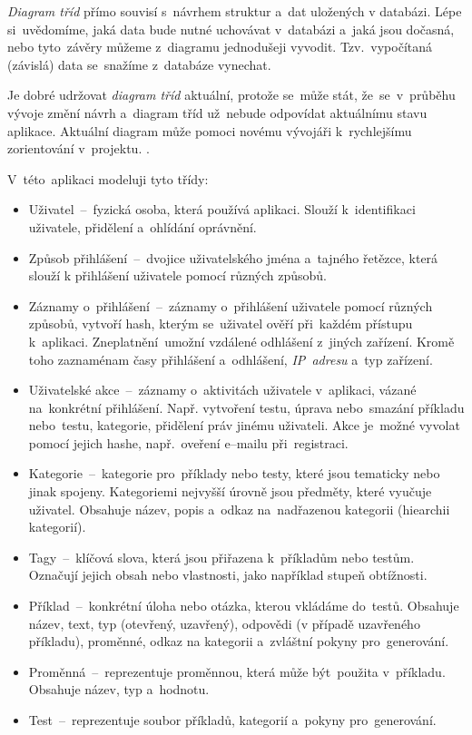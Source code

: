 \documentclass[11pt,a4paper]{report}
\begin{document}
                \emph{Diagram tříd} přímo souvisí s~návrhem struktur a~dat uložených v databázi. Lépe si~uvědomíme, jaká data bude nutné uchovávat v~databázi a~jaká jsou dočasná, nebo tyto~závěry můžeme z~diagramu jednodušeji vyvodit. Tzv.~vypočítaná (závislá) data se~snažíme z~databáze vynechat.

                Je dobré udržovat \emph{diagram tříd} aktuální, protože se~může stát, že~se~v~průběhu vývoje změní návrh a~diagram tříd už~nebude odpovídat aktuálnímu stavu aplikace. Aktuální diagram může pomoci novému vývojáři k~rychlejšímu zorientování v~projektu. \cite{visualparadigmClassDiagram}.

                
                V~této~aplikaci modeluji tyto třídy:

                \begin{itemize}
                    \item Uživatel~--~fyzická osoba, která používá aplikaci. Slouží k~identifikaci uživatele, přidělení a~ohlídání oprávnění.
                    \item Způsob přihlášení~--~dvojice uživatelského jména a~tajného řetězce, která slouží k přihlášení uživatele pomocí různých způsobů.
                    \item Záznamy o~přihlášení~--~záznamy o~přihlášení uživatele pomocí různých způsobů, vytvoří hash, kterým se~uživatel ověří při~každém přístupu k~aplikaci. Zneplatnění~umožní vzdálené odhlášení z~jiných zařízení. Kromě toho zaznaménam časy přihlášení a~odhlášení, \emph{IP~adresu} a~typ zařízení.
                    \item Uživatelské akce~--~záznamy o~aktivitách uživatele v~aplikaci, vázané na~konkrétní přihlášení. Např. vytvoření testu, úprava nebo~smazání příkladu nebo~testu, kategorie, přidělení práv jinému uživateli. Akce je~možné vyvolat pomocí jejich hashe, např.~oveření e--mailu při~registraci.
                    \item Kategorie~--~kategorie pro~příklady nebo testy, které jsou tematicky nebo jinak spojeny. Kategoriemi nejvyšší úrovně jsou předměty, které vyučuje uživatel. Obsahuje název, popis a~odkaz na~nadřazenou kategorii (hiearchii kategorií).
                    \item Tagy~--~klíčová slova, která jsou přiřazena k~příkladům nebo testům. Označují jejich obsah nebo vlastnosti, jako například stupeň obtížnosti.
                    \item Příklad~--~konkrétní úloha nebo otázka, kterou vkládáme do~testů. Obsahuje název, text, typ (otevřený, uzavřený), odpovědi (v případě uzavřeného příkladu), proměnné, odkaz na kategorii a~zvláštní pokyny pro~generování.
                    \item Proměnná~--~reprezentuje proměnnou, která může být~použita v~příkladu. Obsahuje název, typ a~hodnotu.
                    \item Test~--~reprezentuje soubor příkladů, kategorií a~pokyny pro~generování.
                \end{itemize}
\end{document}
